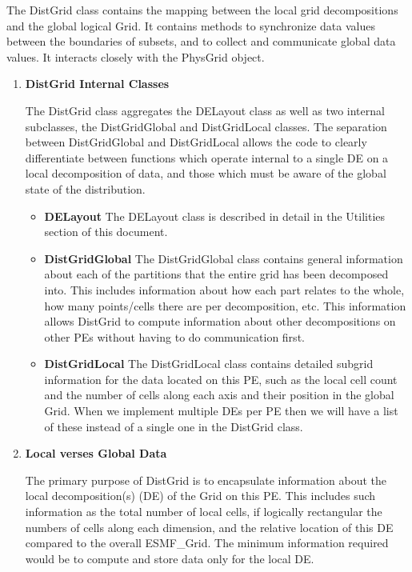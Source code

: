 

The DistGrid class contains the mapping between the local grid decompositions
and the global logical Grid.  It contains methods to synchronize data values
between the boundaries of subsets, and to collect and communicate global data
values. It interacts closely with the PhysGrid object.

\begin{enumerate}

\item {\bf DistGrid Internal Classes}

The DistGrid class aggregates the DELayout class as well as two internal subclasses,
the DistGridGlobal and DistGridLocal classes.  The separation between DistGridGlobal
and DistGridLocal allows the code to clearly differentiate between functions which
operate internal to a single DE on a local decomposition of data, and those which
must be aware of the global state of the distribution.
\begin{itemize}
\item {\bf DELayout} The DELayout class is described in detail in the Utilities
section of this document.
\item {\bf DistGridGlobal} The DistGridGlobal class contains general information
about each of the partitions that the entire grid has been decomposed into. This
includes information about how each part relates to the whole, how many points/cells
there are per decomposition, etc.  This information allows DistGrid to compute
information about other decompositions on other PEs without having to do communication
first.
\item {\bf DistGridLocal} The DistGridLocal class contains detailed subgrid
information for the data located on this PE, such as the local cell count and the
number of cells along each axis and their position in the global Grid.  When we
implement multiple DEs per PE then we will have a list of these instead of a single
one in the DistGrid class.
\end{itemize}

\item {\bf Local verses Global Data}

The primary purpose of DistGrid is to encapsulate information
about the local decomposition(s) (DE) of the Grid on this PE.  
This includes such information as the total 
number of local cells, if logically rectangular the numbers of cells along 
each dimension, and the relative location of this DE compared to the
overall ESMF\_Grid.  The minimum information required would be
to compute and store data only for the local DE.


\end{enumerate}

